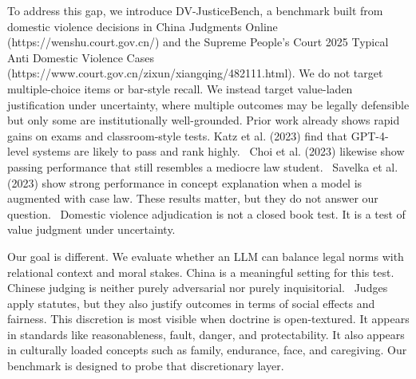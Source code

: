 {To address this gap, we introduce DV-JusticeBench, a benchmark built from domestic violence decisions in China Judgments Online (https://wenshu.court.gov.cn/) and the Supreme People's Court 2025 Typical Anti Domestic Violence Cases (https://www.court.gov.cn/zixun/xiangqing/482111.html). We do not target multiple-choice items or bar-style recall. We instead target value-laden justification under uncertainty, where multiple outcomes may be legally defensible but only some are institutionally well-grounded. Prior work already shows rapid gains on exams and classroom-style tests. Katz et al. (2023) find that GPT-4-level systems are likely to pass and rank highly.~\cite{ref25} Choi et al. (2023) likewise show passing performance that still resembles a mediocre law student.~\cite{ref26} Savelka et al. (2023) show strong performance in concept explanation when a model is augmented with case law. These results matter, but they do not answer our question.~\cite{ref27} Domestic violence adjudication is not a closed book test. It is a test of value judgment under uncertainty.

Our goal is different. We evaluate whether an LLM can balance legal norms with relational context and moral stakes. China is a meaningful setting for this test. Chinese judging is neither purely adversarial nor purely inquisitorial.~\cite{ref28} Judges apply statutes, but they also justify outcomes in terms of social effects and fairness. This discretion is most visible when doctrine is open-textured. It appears in standards like reasonableness, fault, danger, and protectability. It also appears in culturally loaded concepts such as family, endurance, face, and caregiving. Our benchmark is designed to probe that discretionary layer.

}
